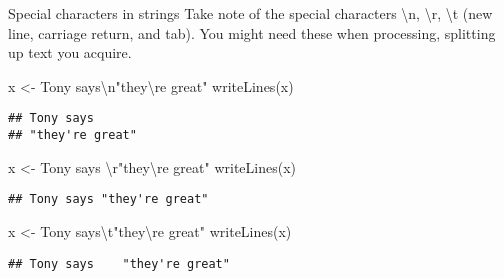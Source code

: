\documentclass[
  10pt,
  ignorenonframetext,
  aspectratio=169]{beamer}
\newenvironment{Shaded}{\begin{snugshade}}{\end{snugshade}}
\newcommand{\FunctionTok}[1]{\textcolor[rgb]{0.94,0.94,0.56}{#1}}
\newcommand{\NormalTok}[1]{\textcolor[rgb]{0.80,0.80,0.80}{#1}}
\newcommand{\OtherTok}[1]{\textcolor[rgb]{0.94,0.94,0.56}{#1}}
\newcommand{\SpecialCharTok}[1]{\textcolor[rgb]{0.86,0.64,0.64}{#1}}
\newcommand{\StringTok}[1]{\textcolor[rgb]{0.80,0.58,0.58}{#1}}
\begin{document}
\begin{frame}[fragile]{Special characters in strings}
\protect\hypertarget{special-characters-in-strings}{}
Take note of the special characters \textbackslash n, \textbackslash r,
\textbackslash t (new line, carriage return, and tab). You might need
these when processing, splitting up text you acquire.

\scriptsize

\begin{Shaded}
\begin{Highlighting}[]
\NormalTok{x }\OtherTok{\textless{}{-}} \StringTok{\textquotesingle{}Tony says}\SpecialCharTok{\textbackslash{}n}\StringTok{"they}\SpecialCharTok{\textbackslash{}\textquotesingle{}}\StringTok{re great"\textquotesingle{}}
\FunctionTok{writeLines}\NormalTok{(x)}
\end{Highlighting}
\end{Shaded}

\begin{verbatim}
## Tony says
## "they're great"
\end{verbatim}

\begin{Shaded}
\begin{Highlighting}[]
\NormalTok{x }\OtherTok{\textless{}{-}} \StringTok{\textquotesingle{}Tony says }\SpecialCharTok{\textbackslash{}r}\StringTok{"they}\SpecialCharTok{\textbackslash{}\textquotesingle{}}\StringTok{re great"\textquotesingle{}}
\FunctionTok{writeLines}\NormalTok{(x)}
\end{Highlighting}
\end{Shaded}

\begin{verbatim}
## Tony says "they're great"
\end{verbatim}

\begin{Shaded}
\begin{Highlighting}[]
\NormalTok{x }\OtherTok{\textless{}{-}} \StringTok{\textquotesingle{}Tony says}\SpecialCharTok{\textbackslash{}t}\StringTok{"they}\SpecialCharTok{\textbackslash{}\textquotesingle{}}\StringTok{re great"\textquotesingle{}}
\FunctionTok{writeLines}\NormalTok{(x)}
\end{Highlighting}
\end{Shaded}

\begin{verbatim}
## Tony says    "they're great"
\end{verbatim}
\end{frame}
\end{document}

